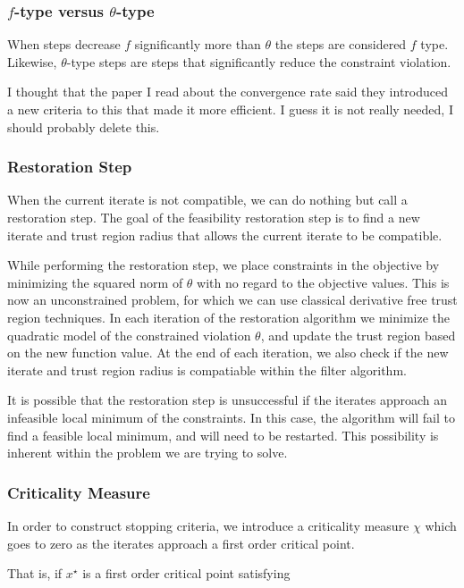 \documentclass{article}
\begin{document}
\subsubsection{$f$-type versus $\theta$-type}

When steps decrease $f$ significantly more than $\theta$ the steps are considered $f$ type.
Likewise, $\theta$-type steps are steps that significantly reduce the constraint violation.

I thought that the paper I read about the convergence rate said they introduced a new criteria to this that made it more efficient.
I guess it is not really needed, I should probably delete this.

\subsubsection{Restoration Step}

When the current iterate is not compatible, we can do nothing but call a restoration step.
The goal of the feasibility restoration step is to find a new iterate and trust region radius that allows the current iterate to be compatible.

While performing the restoration step, we place constraints in the objective by minimizing the squared norm of $\theta$ with no regard to the objective values.
This is now an unconstrained problem, for which we can use classical derivative free trust region techniques.
In each iteration of the restoration algorithm we minimize the quadratic model of the constrained violation $\theta$, and update the trust region based on the new function value.
At the end of each iteration, we also check if the new iterate and trust region radius is compatiable within the filter algorithm.

It is possible that the restoration step is unsuccessful if the iterates approach an infeasible local minimum of the constraints.
In this case, the algorithm will fail to find a feasible local minimum, and will need to be restarted.
This possibility is inherent within the problem we are trying to solve.

\subsubsection{Criticality Measure}
In order to construct stopping criteria, we introduce a criticality measure $\chi$ which goes to zero as the iterates approach a first order critical point.

That is, if $x^{\star}$ is a first order critical point satisfying
\end{document}
